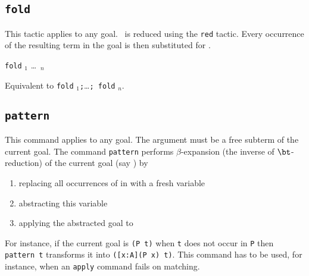 
\subsection{{\tt fold} \term}

This tactic applies to any goal. \term\ is reduced using the {\tt red}
tactic. Every occurrence of the resulting term in the goal is then
substituted for \term.

\begin{Variants}
\item {\tt fold} \term$_1$ \dots\ \term$_n$ 
  
  Equivalent to {\tt fold} \term$_1${\tt;}\ldots{\tt; fold} \term$_n$.
\end{Variants}

\subsection{{\tt pattern {\term}}}
\label{pattern}

This command applies to any goal. The argument {\term} must be a free
subterm of the current goal.  The command {\tt pattern} performs
$\beta$-expansion (the inverse of $\bt$-reduction) of the current goal
(say \T) by
\begin{enumerate}
\item replacing all occurrences of {\term} in {\T} with a fresh variable
\item abstracting this variable
\item applying the abstracted goal to {\term}
\end{enumerate}
For instance, if the current goal {\T} is {\tt (P t)} when {\tt t} does not occur in
{\tt P} then {\tt pattern t} transforms it into {\tt ([x:A](P x) t)}. This
command has to be used, for instance, when an {\tt apply} command
fails on matching.

